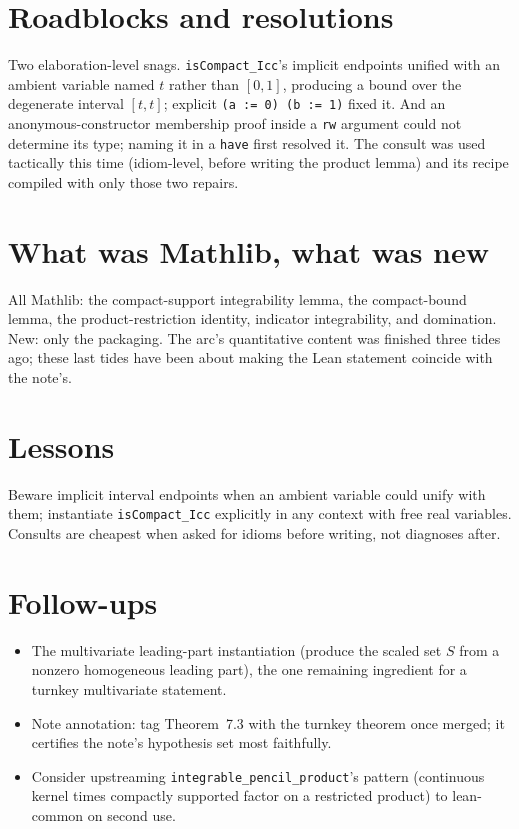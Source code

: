 \documentclass[11pt]{article}
\begin{document}
\section{Roadblocks and resolutions}

Two elaboration-level snags. \texttt{isCompact\_Icc}'s implicit endpoints
unified with an ambient variable named $t$ rather than $[0,1]$, producing a
bound over the degenerate interval $[t,t]$; explicit
\texttt{(a := 0) (b := 1)} fixed it. And an anonymous-constructor
membership proof inside a \texttt{rw} argument could not determine its
type; naming it in a \texttt{have} first resolved it. The consult was used
tactically this time (idiom-level, before writing the product lemma) and
its recipe compiled with only those two repairs.

\section{What was Mathlib, what was new}

All Mathlib: the compact-support integrability lemma, the compact-bound
lemma, the product-restriction identity, indicator integrability, and
domination. New: only the packaging. The arc's quantitative content was
finished three tides ago; these last tides have been about making the Lean
statement coincide with the note's.

\section{Lessons}

Beware implicit interval endpoints when an ambient variable could unify
with them; instantiate \texttt{isCompact\_Icc} explicitly in any context
with free real variables. Consults are cheapest when asked for idioms
before writing, not diagnoses after.

\section{Follow-ups}

\begin{itemize}
\item The multivariate leading-part instantiation (produce the scaled set
$S$ from a nonzero homogeneous leading part), the one remaining ingredient
for a turnkey multivariate statement.
\item Note annotation: tag Theorem~7.3 with the turnkey theorem once
merged; it certifies the note's hypothesis set most faithfully.
\item Consider upstreaming \texttt{integrable\_pencil\_product}'s pattern
(continuous kernel times compactly supported factor on a restricted
product) to lean-common on second use.
\end{itemize}
\end{document}
